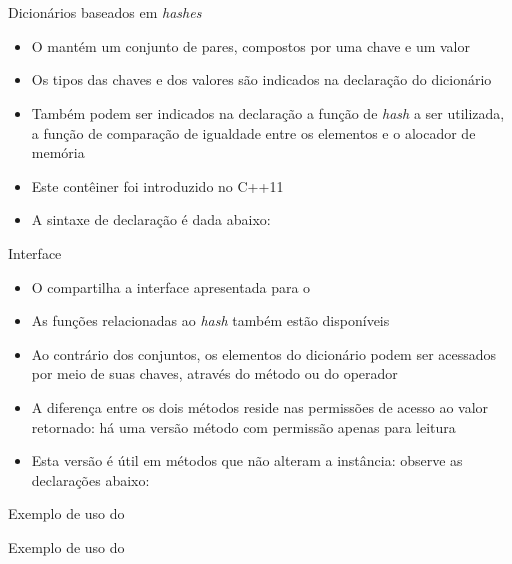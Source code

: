 \section{}

\begin{frame}[fragile]{Dicionários baseados em {\it hashes}} 

    \begin{itemize}
        \item O  mantém um conjunto de pares, compostos por 
            uma chave e um valor

        \item Os tipos  das chaves e dos valores são indicados na declaração do 
            dicionário

        \item Também podem ser indicados na declaração a função de \textit{hash} a ser utilizada,
            a função de comparação de igualdade entre os elementos e o alocador de memória

        \item Este contêiner foi introduzido no C++11
    
        \item A sintaxe de declaração é dada abaixo:

    \end{itemize}

\end{frame}

\begin{frame}[fragile]{Interface}

    \begin{itemize}
        \item O  compartilha a interface apresentada
            para o 

        \item As funções relacionadas ao \textit{hash} também estão disponíveis

        \item Ao contrário dos conjuntos, os elementos do dicionário podem ser acessados
            por meio de suas chaves, através do método  ou do operador

        \item A diferença entre os dois métodos reside nas permissões de acesso ao valor
            retornado: há uma versão método  com permissão apenas para leitura

        \item Esta versão é útil em métodos que não alteram a instância: observe as declarações
            abaixo:

    \end{itemize}

\end{frame}

\begin{frame}[fragile]{Exemplo de uso do }
\end{frame}

\begin{frame}[fragile]{Exemplo de uso do }
\end{frame}


